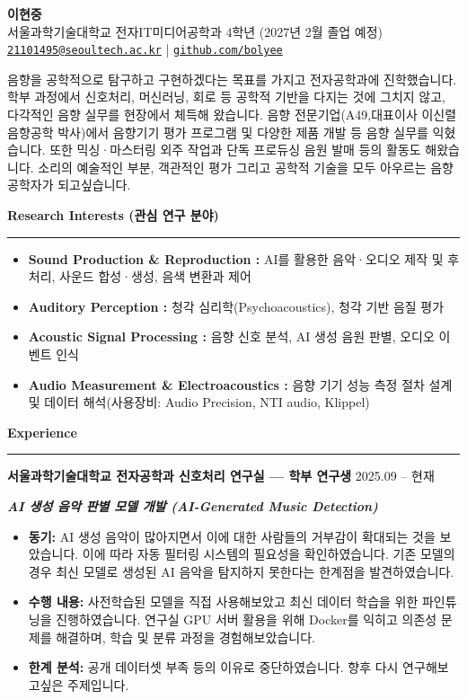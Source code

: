 \documentclass[letterpaper,12pt]{article}
\newcommand{\cvsection}[1]{%
    \vspace{15pt}%
    {\Large\bfseries #1}%
    \vspace{3pt}\hrule\vspace{6pt}%
}
\newcommand{\cventry}[2]{%
    \vspace{9pt}%
    \textbf{#1} \hfill #2\par\vspace{2pt}%
}
\newcommand{\cvsub}[1]{%
    \vspace{8pt}%
    \hspace*{10pt}\textbf{\textit{#1}}\par\vspace{2pt}%
}
\begin{document}
\begin{center}
    {\Huge \bfseries 이현중} \\ \vspace{6pt}
    서울과학기술대학교 전자IT미디어공학과 4학년 (2027년 2월 졸업 예정) \\ \vspace{4pt}
    \href{mailto:21101495@seoultech.ac.kr}{\texttt{21101495@seoultech.ac.kr}} | \href{https://github.com/bolyee}{\texttt{github.com/bolyee}}
\end{center}

\vspace{8pt}

음향을 공학적으로 탐구하고 구현하겠다는 목표를 가지고 전자공학과에 진학했습니다. 학부 과정에서 신호처리, 머신러닝, 회로 등 공학적 기반을 다지는 것에 그치지 않고, 다각적인 음향 실무를 현장에서 체득해 왔습니다. 음향 전문기업(A49,대표이사 이신렬 음향공학 박사)에서 음향기기 평가 프로그램 및 다양한 제품 개발 등 음향 실무를 익혔습니다. 또한 믹싱·마스터링 외주 작업과 단독 프로듀싱 음원 발매 등의 활동도 해왔습니다. 소리의 예술적인 부분, 객관적인 평가 그리고 공학적 기술을 모두 아우르는 음향공학자가 되고싶습니다.

\cvsection{Research Interests (관심 연구 분야)}
\begin{itemize}
    \item \textbf{ Sound Production \& Reproduction :} AI를 활용한 음악·오디오 제작 및 후처리, 사운드 합성·생성, 음색 변환과 제어
    \item \textbf{Auditory Perception :} 청각 심리학(Psychoacoustics), 청각 기반 음질 평가
    \item \textbf{Acoustic Signal Processing :} 음향 신호 분석, AI 생성 음원 판별, 오디오 이벤트 인식
    \item \textbf{Audio Measurement \& Electroacoustics :} 음향 기기 성능 측정 절차 설계 및 데이터 해석(사용장비: Audio Precision, NTI audio, Klippel)
\end{itemize}

\cvsection{Experience}

\cventry{서울과학기술대학교 전자공학과 신호처리 연구실 --- 학부 연구생}{2025.09 -- 현재}

\cvsub{AI 생성 음악 판별 모델 개발 (AI-Generated Music Detection)}
\begin{itemize}
    \item \textbf{동기:} AI 생성 음악이 많아지면서 이에 대한 사람들의 거부감이 확대되는 것을 보았습니다. 이에 따라 자동 필터링 시스템의 필요성을 확인하였습니다. 기존 모델의 경우 최신 모델로 생성된 AI 음악을 탐지하지 못한다는 한계점을 발견하였습니다.
    \item \textbf{수행 내용:} 사전학습된 모델을 직접 사용해보았고 최신 데이터 학습을 위한 파인튜닝을 진행하였습니다. 연구실 GPU 서버 활용을 위해 Docker를 익히고 의존성 문제를 해결하며, 학습 및 분류 과정을 경험해보았습니다.
    \item \textbf{한계 분석:} 공개 데이터셋 부족 등의 이유로 중단하였습니다. 향후 다시 연구해보고싶은 주제입니다.
\end{itemize}
\end{document}
